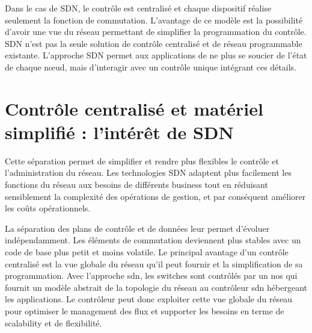 Dans le cas de SDN, le contrôle est centralisé et chaque dispositif réalise seulement la fonction de commutation. L'avantage de ce modèle est la possibilité d'avoir une vue du réseau permettant de simplifier la programmation du contrôle. SDN n'est pas la seule solution de contrôle centralisé et de réseau programmable existante. L'approche SDN permet aux applications de ne plus se soucier de l'état de chaque nœud, mais d'interagir avec un contrôle unique intégrant ces détails. \cite{sdnbookControlDataPlanes}





\section{Contrôle centralisé et matériel simplifié : l'intérêt de SDN}



Cette séparation permet de simplifier et rendre plus flexibles le contrôle et l'administration du réseau. Les technologies SDN adaptent plus facilement les fonctions du réseau aux besoins de différents business tout en réduisant sensiblement la complexité des opérations de gestion, et par conséquent améliorer les coûts opérationnels. \cite{sndChineseBookConceptsApplications}


La séparation des plans de contrôle et de données leur permet d'évoluer indépendamment. Les éléments de commutation deviennent plus stables avec un code de base plus petit et moins volatile. 
Le principal avantage d'un contrôle centralisé est la vue globale du réseau qu'il peut fournir et la simplification de sa  programmation. Avec l'approche \gls{sdn}, les switches sont contrôlés par un \gls{nos} qui fournit un modèle abstrait de la topologie du réseau au contrôleur \gls{sdn} hébergeant les applications. Le contrôleur peut donc exploiter cette vue globale du réseau pour optimiser le management des flux et supporter les besoins en terme de \gls{scalability} et de flexibilité. \cite{WhySDN}

